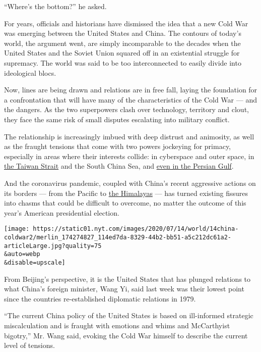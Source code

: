 ``Where's the bottom?'' he asked.

For years, officials and historians have dismissed the idea that a new
Cold War was emerging between the United States and China. The contours
of today's world, the argument went, are simply incomparable to the
decades when the United States and the Soviet Union squared off in an
existential struggle for supremacy. The world was said to be too
interconnected to easily divide into ideological blocs.

Now, lines are being drawn and relations are in free fall, laying the
foundation for a confrontation that will have many of the
characteristics of the Cold War --- and the dangers. As the two
superpowers clash over technology, territory and clout, they face the
same risk of small disputes escalating into military conflict.

The relationship is increasingly imbued with deep distrust and
animosity, as well as the fraught tensions that come with two powers
jockeying for primacy, especially in areas where their interests
collide: in cyberspace and outer space, in
\href{https://www.nytimes.com/2020/07/01/world/asia/taiwan-china-hong-kong.html}{the
Taiwan Strait} and the South China Sea, and
\href{https://www.nytimes.com/2020/07/11/world/asia/china-iran-trade-military-deal.html}{even
in the Persian Gulf}.

And the coronavirus pandemic, coupled with China's recent aggressive
actions on its borders --- from the Pacific to
\href{https://www.nytimes.com/2020/06/17/world/asia/china-india-border.html}{the
Himalayas} --- has turned existing fissures into chasms that could be
difficult to overcome, no matter the outcome of this year's American
presidential election.

\texttt{[image: https://static01.nyt.com/images/2020/07/14/world/14china-coldwar2/merlin\_174274827\_114ed7da-8329-44b2-bb51-a5c212dc61a2-articleLarge.jpg?quality=75\\\&auto=webp\\\&disable=upscale]}

From Beijing's perspective, it is the United States that has plunged
relations to what China's foreign minister, Wang Yi, said last week was
their lowest point since the countries re-established diplomatic
relations in 1979.

``The current China policy of the United States is based on ill-informed
strategic miscalculation and is fraught with emotions and whims and
McCarthyist bigotry,'' Mr. Wang said, evoking the Cold War himself to
describe the current level of tensions.

